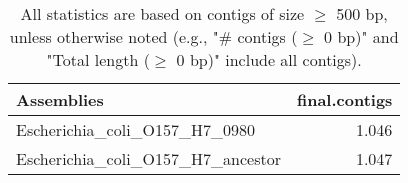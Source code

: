 \documentclass[12pt,a4paper]{article}
\begin{document}
\begin{table}[ht]
\begin{center}
\caption{All statistics are based on contigs of size $\geq$ 500 bp, unless otherwise noted (e.g., "\# contigs ($\geq$ 0 bp)" and "Total length ($\geq$ 0 bp)" include all contigs).}
\begin{tabular}{|l*{1}{|r}|}
\hline
Assemblies & final.contigs \\ \hline
Escherichia\_coli\_O157\_H7\_0980 & 1.046 \\ \hline
Escherichia\_coli\_O157\_H7\_ancestor & 1.047 \\ \hline
\end{tabular}
\end{center}
\end{table}
\end{document}
